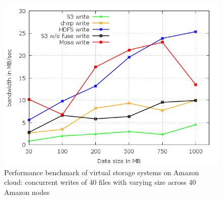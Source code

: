 \documentclass{sig-alternate}
\begin{document}
\begin{figure}[htb]
\begin{center}
\includegraphics[width=\linewidth]{plots/par-write-bw.png}
\caption{Performance benchmark of virtual storage systems on Amazon cloud:
concurrent writes of 40 files with varying size across 40 Amazon nodes
\label{fig:par-wr-bench} }
\end{center}
\end{figure}
\end{document}
